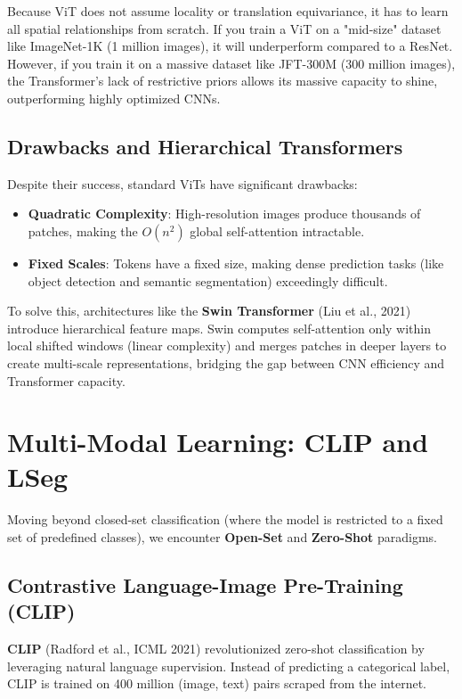 \begin{insightbox}
Because ViT does not assume locality or translation equivariance, it has to learn all spatial relationships from scratch. If you train a ViT on a "mid-size" dataset like ImageNet-1K (1 million images), it will underperform compared to a ResNet. However, if you train it on a massive dataset like JFT-300M (300 million images), the Transformer's lack of restrictive priors allows its massive capacity to shine, outperforming highly optimized CNNs.
\end{insightbox}

\subsection{Drawbacks and Hierarchical Transformers}
Despite their success, standard ViTs have significant drawbacks:
\begin{itemize}
    \item \textbf{Quadratic Complexity}: High-resolution images produce thousands of patches, making the $O(n^2)$ global self-attention intractable.
    \item \textbf{Fixed Scales}: Tokens have a fixed size, making dense prediction tasks (like object detection and semantic segmentation) exceedingly difficult.
\end{itemize}

To solve this, architectures like the \textbf{Swin Transformer} (Liu et al., 2021) introduce hierarchical feature maps. Swin computes self-attention only within local shifted windows (linear complexity) and merges patches in deeper layers to create multi-scale representations, bridging the gap between CNN efficiency and Transformer capacity.

\section{Multi-Modal Learning: CLIP and LSeg}
\label{sec:clip_lseg}

Moving beyond closed-set classification (where the model is restricted to a fixed set of predefined classes), we encounter \textbf{Open-Set} and \textbf{Zero-Shot} paradigms.

\subsection{Contrastive Language-Image Pre-Training (CLIP)}
\textbf{CLIP} (Radford et al., ICML 2021) revolutionized zero-shot classification by leveraging natural language supervision. Instead of predicting a categorical label, CLIP is trained on 400 million (image, text) pairs scraped from the internet.

